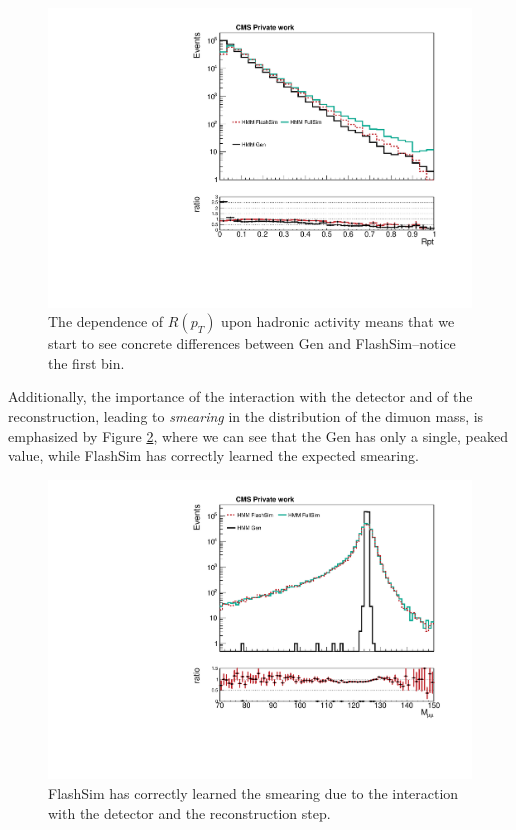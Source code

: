 \begin{figure}
    \centering
    \includegraphics[width=\linewidth]{gfx/ch6/gen_vs_flash_Rpt___PreSel_log.pdf}
    \caption[Gen vs FlashSim for $R(p_T)$]{The dependence of $R(p_T)$ upon hadronic activity means that we start to see concrete differences between Gen and FlashSim--notice the first bin.}
    \label{fig:rptgen}
   \end{figure}
   
Additionally, the importance of the interaction with the detector and of the reconstruction, leading to \emph{smearing} in the distribution of the dimuon mass, is emphasized by Figure \ref{fig:higggen}, where we can see that the Gen has only a single, peaked value, while FlashSim has correctly learned the expected smearing.

\begin{figure}
    \centering
    \includegraphics[width=\linewidth]{gfx/ch6/gen_vs_flash_Higgs_m___PreSel_log.pdf}
    \caption[Gen vs FlashSim for $M_{\mu\mu}$]{FlashSim has correctly learned the smearing due to the interaction with the detector and the reconstruction step.}
    \label{fig:higggen}
   \end{figure}
   
